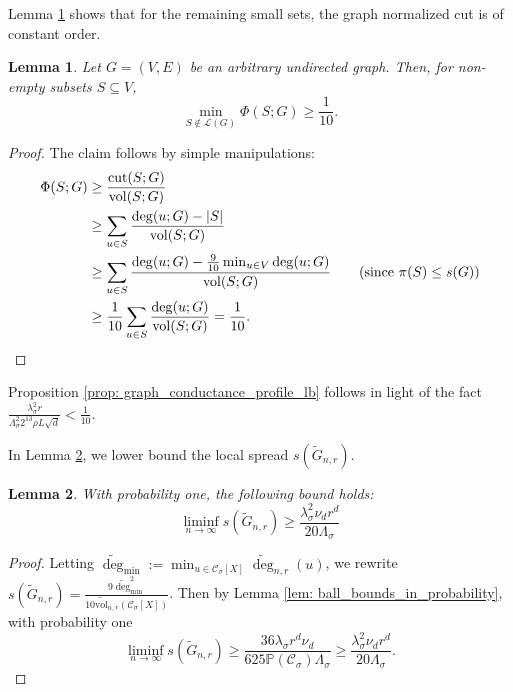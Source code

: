 \documentclass{article}
\DeclarePairedDelimiter\abs{\lvert}{\rvert}
\newcommand{\vol}{\mathrm{vol}}
\newcommand{\cut}{\mathrm{cut}}
\newcommand{\1}{\mathbf{1}}
\newcommand{\Xbf}{X}             %
\newcommand{\Pbb}{\mathbb{P}}
\newcommand{\Cset}{\mathcal{C}}
\newcommand{\Csig}{\Cset_{\sigma}}
\newcommand{\degminwt}{\widetilde{\deg}_{\min}}
\theoremstyle{aldenthm}
\newtheorem{lemma}{Lemma}
\theoremstyle{aldenrmrk}
\begin{document}
Lemma \ref{lem: graph_conductance_profile_lb_1} shows that for the remaining small sets, the graph normalized cut is of constant order. 
\begin{lemma}
	\label{lem: graph_conductance_profile_lb_1}
	Let $G = (V,E)$ be an arbitrary undirected graph. Then, for non-empty subsets $S \subseteq V$, 
	\begin{equation*}
	\min_{S \not\in \mathcal{L}(G)}\Phi(S; G) \geq \frac{1}{10}.
	\end{equation*}
\end{lemma}
\begin{proof}
	The claim follows by simple manipulations:
	\begin{align*}
	\Phi(S;G) & \geq \frac{\cut(S;G)}{\vol(S;G)} \\
	& \geq \sum_{u \in S} \frac{\deg(u;G) - \abs{S}}{\vol(S;G)} \\
	& \geq \sum_{u \in S} \frac{\deg(u;G) - \frac{9}{10} \min_{u \in V}\deg(u;G)}{\vol(S;G)} \tag{since $\pi(S) \leq s(G)$}\\ 
	& \geq \frac{1}{10} \sum_{u \in S} \frac{\deg(u;G)}{\vol(S;G)} = \frac{1}{10}.
	\end{align*}
\end{proof}

Proposition \ref{prop: graph_conductance_profile_lb} follows in light of the fact $\frac{\lambda_{\sigma}^2 r}{\Lambda_{\sigma}^2 2^{13} \rho L \sqrt{d}} < \frac{1}{10}$.

In Lemma \ref{lem: local_spread_lb}, we lower bound the local spread $s(\widetilde{G}_{n,r})$.

\begin{lemma}
	\label{lem: local_spread_lb}
	With probability one, the following bound holds:
	\begin{equation*}
	\liminf_{n \to \infty} s(\widetilde{G}_{n,r}) \geq \frac{\lambda_{\sigma}^2 \nu_d r^d}{20\Lambda_{\sigma}} 
	\end{equation*}
\end{lemma}
\begin{proof}
	Letting $\degminwt := \min_{u \in \Csig[\Xbf]} \widetilde{\deg}_{n,r}(u)$, we rewrite $s(\widetilde{G}_{n,r}) = \frac{9 \degminwt^2}{10\widetilde{\vol}_{n,r}(\Csig[\Xbf])}$. Then by Lemma \ref{lem: ball_bounds_in_probability}, with probability one
	\begin{equation*}
	\liminf_{n \to \infty} s(\widetilde{G}_{n,r}) \geq \frac{36 \lambda_{\sigma} r^d \nu_d}{625 \Pbb(\Csig) \Lambda_{\sigma}} \geq \frac{\lambda_{\sigma}^2 \nu_d r^d}{20\Lambda_{\sigma}}.
	\end{equation*}
\end{proof}
\end{document}
